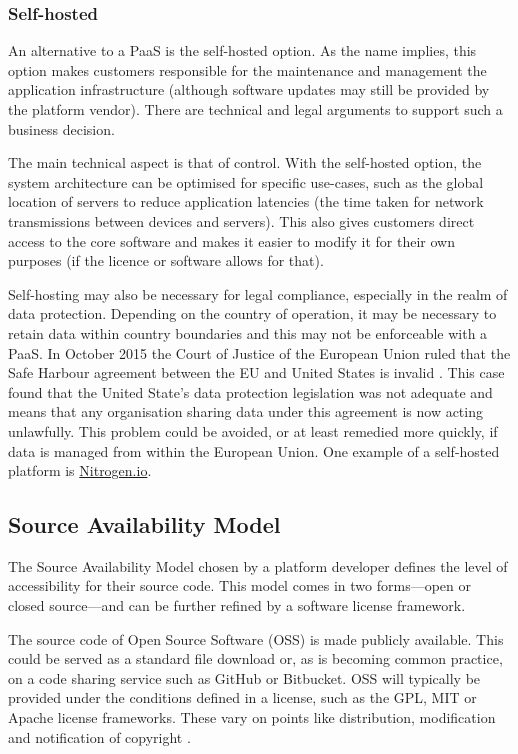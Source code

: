       \subsubsection{Self-hosted}
        An alternative to a PaaS is the self-hosted option. As the name implies, this option makes customers responsible for the maintenance and management the application infrastructure (although software updates may still be provided by the platform vendor). There are technical and legal arguments to support such a business decision.

        The main technical aspect is that of control. With the self-hosted option, the system architecture can be optimised for specific use-cases, such as the global location of servers to reduce application latencies (the time taken for network transmissions between devices and servers). This also gives customers direct access to the core software and makes it easier to modify it for their own purposes (if the licence or software allows for that).

        Self-hosting may also be necessary for legal compliance, especially in the realm of data protection. Depending on the country of operation, it may be necessary to retain data within country boundaries and this may not be enforceable with a PaaS. In October 2015 the Court of Justice of the European Union ruled that the Safe Harbour agreement between the EU and United States is invalid \citep{C362/14}. This case found that the United State's data protection legislation was not adequate and means that any organisation sharing data under this agreement is now acting unlawfully. This problem could be avoided, or at least remedied more quickly, if data is managed from within the European Union. One example of a self-hosted platform is \href{http://nitrogen.io/}{Nitrogen.io}.


    \subsection{Source Availability Model}
      The Source Availability Model chosen by a platform developer defines the level of accessibility for their source code. This model comes in two forms---open or closed source---and can be further refined by a software license framework.

      The source code of Open Source Software (OSS) is made publicly available. This could be served as a standard file download or, as is becoming common practice, on a code sharing service such as GitHub or Bitbucket. OSS will typically be provided under the conditions defined in a license, such as the GPL, MIT or Apache license frameworks. These vary on points like distribution, modification and notification of copyright \citep{license:2015}.


